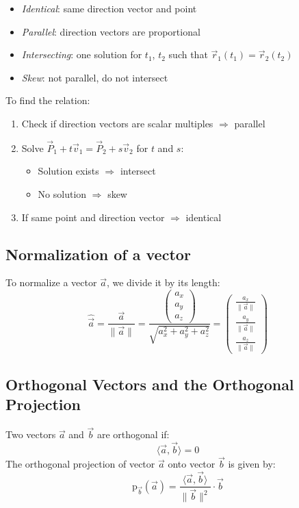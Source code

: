\begin{itemize}[label=\(-\)]
	\item \emph{Identical}: same direction vector and point
	\item \emph{Parallel}: direction vectors are proportional
	\item \emph{Intersecting}: one solution for \(t_1\), \(t_2\) such that \(\vec{r}_1(t_1) = \vec{r}_2(t_2)\)
	\item \emph{Skew}: not parallel, do not intersect
\end{itemize}

To find the relation:
\begin{enumerate}
	\item Check if direction vectors are scalar multiples \(\Rightarrow\) parallel
	\item Solve \(\vec{P}_1 + t\vec{v}_1 = \vec{P}_2 + s\vec{v}_2\) for \(t\) and \(s\):
	      \begin{itemize}
		      \item Solution exists \(\Rightarrow\) intersect
		      \item No solution \(\Rightarrow\) skew
	      \end{itemize}
	\item If same point and direction vector \(\Rightarrow\) identical
\end{enumerate}

\subsection{Normalization of a vector}
To normalize a vector \(\vec{a}\), we divide it by its length:
\[
	\hat{\vec{a}} = \frac{\vec{a}}{\|\vec{a}\|} = \frac{\begin{pmatrix} a_x \\ a_y \\ a_z \end{pmatrix}}{\sqrt{a_x^2 + a_y^2 + a_z^2}} = \begin{pmatrix} \frac{a_x}{\|\vec{a}\|} \\ \frac{a_y}{\|\vec{a}\|} \\ \frac{a_z}{\|\vec{a}\|} \end{pmatrix}
\]

\subsection{Orthogonal Vectors and the Orthogonal Projection}
Two vectors \(\vec{a}\) and \(\vec{b}\) are orthogonal if:
\[
	\langle\vec{a}, \vec{b}\rangle = 0
\]
The orthogonal projection of vector \(\vec{a}\) onto vector \(\vec{b}\) is given by:
\[
	\text{p}_{\vec{b}}(\vec{a}) = \frac{\langle\vec{a}, \vec{b}\rangle}{\|\vec{b}\|^2} \cdot \vec{b}
\]

